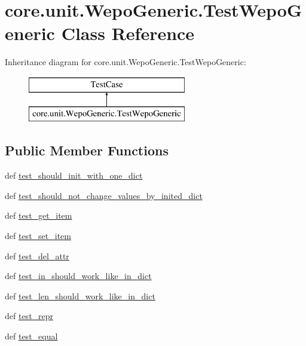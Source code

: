 \hypertarget{classcore_1_1unit_1_1WepoGeneric_1_1TestWepoGeneric}{\section{core.\-unit.\-Wepo\-Generic.\-Test\-Wepo\-Generic Class Reference}
\label{classcore_1_1unit_1_1WepoGeneric_1_1TestWepoGeneric}
}
Inheritance diagram for core.\-unit.\-Wepo\-Generic.\-Test\-Wepo\-Generic\-:\begin{figure}[H]
\begin{center}
\leavevmode
\includegraphics[height=2.000000cm]{classcore_1_1unit_1_1WepoGeneric_1_1TestWepoGeneric}
\end{center}
\end{figure}
\subsection*{Public Member Functions}
\begin{DoxyCompactItemize}
\item 
def \hyperlink{classcore_1_1unit_1_1WepoGeneric_1_1TestWepoGeneric_a4017a0ce9649f413c51cca1a5cb6e33b}{test\-\_\-should\-\_\-init\-\_\-with\-\_\-one\-\_\-dict}
\item 
def \hyperlink{classcore_1_1unit_1_1WepoGeneric_1_1TestWepoGeneric_acd805191665e02c2ed7aba7f443c8214}{test\-\_\-should\-\_\-not\-\_\-change\-\_\-values\-\_\-by\-\_\-inited\-\_\-dict}
\item 
def \hyperlink{classcore_1_1unit_1_1WepoGeneric_1_1TestWepoGeneric_a0a8afb004d38748b28d37a959d35e7c6}{test\-\_\-get\-\_\-item}
\item 
def \hyperlink{classcore_1_1unit_1_1WepoGeneric_1_1TestWepoGeneric_affd16d2807d3ae00f680c10614f9c4c2}{test\-\_\-set\-\_\-item}
\item 
def \hyperlink{classcore_1_1unit_1_1WepoGeneric_1_1TestWepoGeneric_a6dbbc9d768579bb131dca8ada087b58b}{test\-\_\-del\-\_\-attr}
\item 
def \hyperlink{classcore_1_1unit_1_1WepoGeneric_1_1TestWepoGeneric_a82e9f73676915a5507e5f57304ce268e}{test\-\_\-in\-\_\-should\-\_\-work\-\_\-like\-\_\-in\-\_\-dict}
\item 
def \hyperlink{classcore_1_1unit_1_1WepoGeneric_1_1TestWepoGeneric_aa352248252742e4058712dd7940998e9}{test\-\_\-len\-\_\-should\-\_\-work\-\_\-like\-\_\-in\-\_\-dict}
\item 
def \hyperlink{classcore_1_1unit_1_1WepoGeneric_1_1TestWepoGeneric_ac7bcb2eea99b5ed3099dba266eb8f1f4}{test\-\_\-repr}
\item 
def \hyperlink{classcore_1_1unit_1_1WepoGeneric_1_1TestWepoGeneric_aca99d5e5c1102d29331eda4a4888b759}{test\-\_\-equal}
\end{DoxyCompactItemize}


